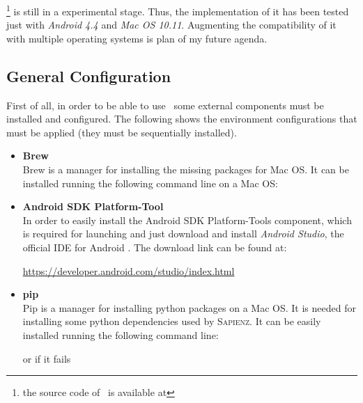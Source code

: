 \toolname\footnote{the source code of \toolname\ is available at \toolurl } is still in a experimental stage. Thus, the implementation of it has been tested just with \textit{Android 4.4} and \textit{Mac OS 10.11}. 
Augmenting the compatibility of it with multiple operating systems is plan of my future agenda. 

\subsection{General Configuration}
First of all, in order to be able to use \toolname\ some external components must be installed and configured. 
The following shows the environment configurations that must be applied (they must be sequentially installed).
\begin{itemize}
\item \textbf{Brew} \\
Brew \cite{brew} is a manager for installing the missing packages for Mac OS. 
It can be installed running the following command line on a Mac OS: 
{\scriptsize
\begin{center}
\end{center}
}%
\item \textbf{Android SDK Platform-Tool}\\
In order to easily install the Android SDK Platform-Tools component, which is required for launching \sapienz and \monkey just download and install \textit{Android Studio}, the official IDE for Android \cite{androidstudio}. 
The download link can be found at:  
\begin{center}
\url{https://developer.android.com/studio/index.html}
\end{center}
\item \textbf{pip} \\
Pip is a manager for installing python packages on a Mac OS. It is needed for installing some python dependencies used by \textsc{Sapienz}.  
It can be easily installed running the following command line: 	
\begin{center}
\end{center}
\begin{center}
or if it fails
\end{center}
\begin{center}
\end{center}

\end{itemize}

